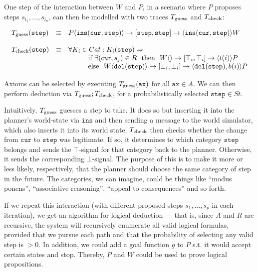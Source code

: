 \documentclass[]{scrartcl}
\theoremstyle{break}
\newcommand{\mt}[1]{\textnormal{#1}}
\renewcommand{\tt}[1]{\texttt{#1}}
\newcommand{\sendsf}[6]{#1\langle #2 \rangle \rightarrow [#3,#4] \rightarrow \langle#5\rangle#6}
\begin{document}
One step of the interaction between $W$ and $P$, in a scenario where $P$ proposes steps $s_{i_1},\dots,s_{i_n}$, can then be modelled with two traces $T_{\mt{guess}}$ and $T_{\mt{check}}$:

$$
	\begin{array}{l l l}
		T_{\mt{guess}}(\tt{step}) & \equiv & \sendsf{P}{\tt{ins}(\tt{cur}, \tt{step})}{\tt{step}}{\tt{step}}{\tt{ins}(\tt{cur}, \tt{step})}{W}\\
		\\
		T_{\mt{check}}(\tt{step}) & \equiv &
		\forall K_i \in Cat: K_i(\tt{step}) \Rightarrow\\
		
		& & \hspace{1cm} \mt{if } \exists (cur, s_j) \in R\ \mt{ then } \
					\sendsf{W}{}{\top_i}{\top_i}{t(i)}{P}\\
		& & \hspace{1cm} \mt{else }\ \sendsf{W}{\tt{del}(\tt{step})}{\bot_i}{\bot_i}{\tt{del}(\tt{step}), b(i)}{P}\\
	\end{array}
$$

\medskip

Axioms can be selected by executing $T_{\mt{guess}}(\tt{ax})$ for all $\tt{ax} \in A$. We can then perform deduction via $T_{\mt{guess}};T_{\mt{check}}$, for a probabilistically selected $\tt{step} \in St$.

Intuitively, $T_{\mt{guess}}$ guesses a step to take. It does so but inserting it into the planner's world-state via $\tt{ins}$ and then sending a message to the world simulator, which also inserts it into its world state. $T_{\mt{check}}$ then checks whether the change from $\tt{cur}$ to $\tt{step}$ was legitimate. If so, it determines to which category $\tt{step}$ belongs and sends the $\top$-signal for that category back to the planner. Otherwise, it sends the corresponding $\bot$-signal. The purpose of this is to make it more or less likely, respectively, that the planner should choose the same category of step in the future. The categories, we can imagine, could be things like ``modus ponens'', ``associative reasoning'', ``appeal to consequences'' and so forth.

If we repeat this interaction (with different proposed steps $s_1,\dots,s_p$ in each iteration), we get an algorithm for logical deduction  --- that is, since $A$ and $R$ are recursive, the system will recursively enumerate all valid logical formulas, provided that we pursue each path and that the probability of selecting any valid step is $> 0$. In addition, we could add a goal function $g$ to $P$ s.t. it would accept certain states and stop. Thereby, $P$ and $W$ could be used to prove logical propositions.
\end{document}
